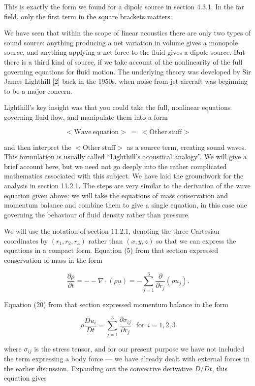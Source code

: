   This is exactly the form we found for a dipole source in section 4.3.1. In 
  the far field, only the first term in the square brackets matters. 

  We have seen that within the scope of linear acoustics there are only two 
  types of sound source: anything producing a net variation in volume gives a 
  monopole source, and anything applying a net force to the fluid gives a 
  dipole source. But there is a third kind of source, if we take account of the 
  nonlinearity of the full governing equations for fluid motion. The underlying 
  theory was developed by Sir James Lighthill [2] back in the 1950s, when noise 
  from jet aircraft was beginning to be a major concern. 

  Lighthill's key insight was that you could take the full, nonlinear equations 
  governing fluid flow, and manipulate them into a form 

  $$<\mathrm{Wave~equation}>\mathrm{~}= \mathrm{~}<\mathrm{Other~stuff}>$$ 

  and then interpret the $<\mathrm{Other~stuff}>$ as a source term, creating 
  sound waves. This formulation is usually called ``Lighthill's acoustical 
  analogy''. We will give a brief account here, but we need not go deeply into 
  the rather complicated mathematics associated with this subject. We have laid 
  the groundwork for the analysis in section 11.2.1. The steps are very similar 
  to the derivation of the wave equation given above: we will take the 
  equations of mass conservation and momentum balance and combine them to give 
  a single equation, in this case one governing the behaviour of fluid density 
  rather than pressure. 

  We will use the notation of section 11.2.1, denoting the three Cartesian 
  coordinates by $(r_1,r_2,r_3)$ rather than $(x,y,z)$ so that we can express 
  the equations in a compact form. Equation (5) from that section expressed 
  conservation of mass in the form 

  $$\dfrac{\partial \rho}{\partial t} = -- \nabla \cdot (\rho \underline{u}) = 
  -\sum_{j=1}^3\dfrac{\partial}{\partial r_j} \left( \rho u_j \right) . 
  \tag{22}$$ 

  Equation (20) from that section expressed momentum balance in the form 

  $$\rho \dfrac{Du_i}{Dt}=\sum_{j=1}^3{\dfrac{\partial \sigma_{ij}}{\partial 
  r_j}}\mathrm{~~~for~~}i=1,2,3 \tag{23}$$ 

  where $\sigma_{ij}$ is the stress tensor, and for our present purpose we have 
  not included the term expressing a body force --- we have already dealt with 
  external forces in the earlier discussion. Expanding out the convective 
  derivative $D/Dt$, this equation gives 


